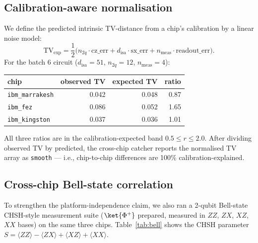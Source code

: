 \documentclass[11pt,a4paper]{article}
\begin{document}
\subsection{Calibration-aware normalisation}

We define the predicted intrinsic TV-distance from a chip's calibration by a linear noise model:
\begin{equation}
\mathrm{TV}_{\mathrm{exp}} = \frac{1}{2}\bigl(n_{2q}\cdot\mathrm{cz\_err} + d_{\mathrm{isa}}\cdot\mathrm{sx\_err} + n_{\mathrm{meas}}\cdot\mathrm{readout\_err}\bigr).
\end{equation}
For the batch 6 circuit ($d_{\mathrm{isa}} = 51$, $n_{2q} = 12$, $n_{\mathrm{meas}} = 4$):

\begin{center}
\begin{tabular}{lrrr}
\toprule
chip & observed TV & expected TV & ratio \\
\midrule
\texttt{ibm\_marrakesh} & 0.042 & 0.048 & 0.87 \\
\texttt{ibm\_fez}       & 0.086 & 0.052 & 1.65 \\
\texttt{ibm\_kingston}  & 0.037 & 0.036 & 1.01 \\
\bottomrule
\end{tabular}
\end{center}

All three ratios are in the calibration-expected band $0.5 \le r \le 2.0$. After dividing observed TV by predicted, the cross-chip catcher reports the normalised TV array as \texttt{smooth} --- i.e., chip-to-chip differences are 100\% calibration-explained.

\subsection{Cross-chip Bell-state correlation}

To strengthen the platform-independence claim, we also ran a 2-qubit Bell-state CHSH-style measurement suite ($\ket{\Phi^{+}}$ prepared, measured in $ZZ$, $ZX$, $XZ$, $XX$ bases) on the same three chips. Table~\ref{tab:bell} shows the CHSH parameter $S = \langle ZZ\rangle - \langle ZX\rangle + \langle XZ\rangle + \langle XX\rangle$.
\end{document}
